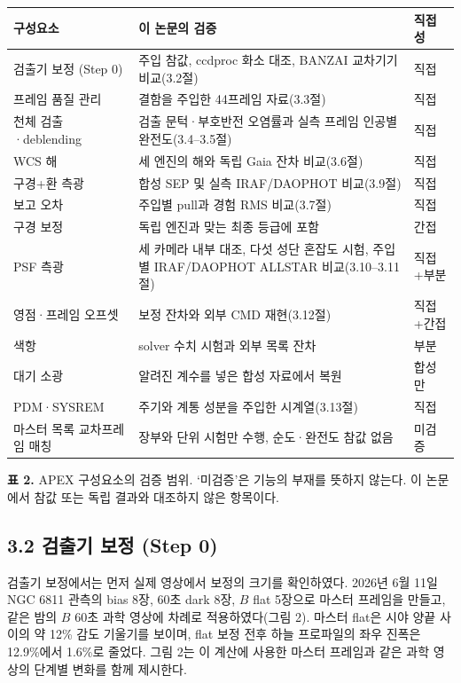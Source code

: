 \begin{table}[!t]
\centering\small
\begin{tabularx}{\textwidth}{XXX}
\toprule
구성요소 & 이 논문의 검증 & 직접성 \\
\midrule
검출기 보정 (Step 0) & 주입 참값, ccdproc 화소 대조, BANZAI 교차기기 비교(3.2절) & 직접 \\
프레임 품질 관리 & 결함을 주입한 44프레임 자료(3.3절) & 직접 \\
천체 검출·deblending & 검출 문턱·부호반전 오염률과 실측 프레임 인공별 완전도(3.4–3.5절) & 직접 \\
WCS 해 & 세 엔진의 해와 독립 Gaia 잔차 비교(3.6절) & 직접 \\
구경+환 측광 & 합성 SEP 및 실측 IRAF/DAOPHOT 비교(3.9절) & 직접 \\
보고 오차 & 주입별 pull과 경험 RMS 비교(3.7절) & 직접 \\
구경 보정 & 독립 엔진과 맞는 최종 등급에 포함 & 간접 \\
PSF 측광 & 세 카메라 내부 대조, 다섯 성단 혼잡도 시험, 주입별 IRAF/DAOPHOT ALLSTAR 비교(3.10–3.11절) & 직접+부분 \\
영점·프레임 오프셋 & 보정 잔차와 외부 CMD 재현(3.12절) & 직접+간접 \\
색항 & solver 수치 시험과 외부 목록 잔차 & 부분 \\
대기 소광 & 알려진 계수를 넣은 합성 자료에서 복원 & 합성만 \\
PDM·SYSREM & 주기와 계통 성분을 주입한 시계열(3.13절) & 직접 \\
마스터 목록 교차프레임 매칭 & 장부와 단위 시험만 수행, 순도·완전도 참값 없음 & 미검증 \\
\bottomrule
\end{tabularx}
\end{table}

\textbf{표 2.} APEX 구성요소의 검증 범위. ‘미검증’은 기능의 부재를 뜻하지 않는다. 이 논문에서 참값 또는 독립 결과와 대조하지 않은 항목이다.



\subsection{3.2 검출기 보정 (Step 0)}

검출기 보정에서는 먼저 실제 영상에서 보정의 크기를 확인하였다. 2026년 6월 11일 NGC 6811 관측의 bias 8장, 60초 dark 8장, $B$ flat 5장으로 마스터 프레임을 만들고, 같은 밤의 $B$ 60초 과학 영상에 차례로 적용하였다(그림 2). 마스터 flat은 시야 양끝 사이의 약 12\% 감도 기울기를 보이며, flat 보정 전후 하늘 프로파일의 좌우 진폭은 12.9\%에서 1.6\%로 줄었다. 그림 2는 이 계산에 사용한 마스터 프레임과 같은 과학 영상의 단계별 변화를 함께 제시한다.



